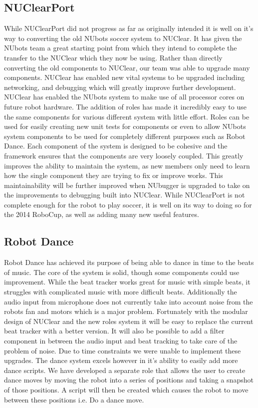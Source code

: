 \documentclass[english,12pt]{scrartcl}
\begin{document}
	\subsection{NUClearPort}
		While NUClearPort did not progress as far as originally intended it is well on it's way to converting the old NUbots soccer system to NUClear.
		It has given the NUbots team a great starting point from which they intend to complete the transfer to the NUClear which they now be using.
		Rather than directly converting the old components to NUClear, our team was able to upgrade many components.
		NUClear has enabled new vital systems to be upgraded including networking, and debugging which will greatly improve further development.
		NUClear has enabled the NUbots system to make use of all processor cores on future robot hardware.
		The addition of roles has made it incredibly easy to use the same components for various different system with little effort.
		Roles can be used for easily creating new unit tests for components or even to allow NUbots system components to be used for completely different purposes such as Robot Dance.
		Each component of the system is designed to be cohesive and the framework ensures that the components are very loosely coupled.
		This greatly improves the ability to maintain the system, as new members only need to learn how the single component they are trying to fix or improve works.
		This maintainability will be further improved when NUbugger is upgraded to take on the improvements to debugging built into NUClear.
		While NUClearPort is not complete enough for the robot to play soccer, it is well on its way to doing so for the 2014 RoboCup, as well as adding many new useful features.
	
	\subsection{Robot Dance}
			Robot Dance has achieved its purpose of being able to dance in time to the beats of music.
			The core of the system is solid, though some components could use improvement.
			While the beat tracker works great for music with simple beats, it struggles with complicated music with more difficult beats.
			Additionally the audio input from microphone does not currently take into account noise from the robots fan and motors which is a major problem.
			Fortunately with the modular design of NUClear and the new roles system it will be easy to replace the current beat tracker with a better version.
			It will also be possible to add a filter component in between the audio input and beat tracking to take care of the problem of noise.
			Due to time constraints we were unable to implement these upgrades.
			The dance system excels however in it's ability to easily add more dance scripts. 
			We have developed a separate role that allows the user to create dance moves by moving the robot into a series of positions and taking a snapshot of those positions. 
			A script will then be created which causes the robot to move between these positions i.e. Do a dance move.
\end{document}
